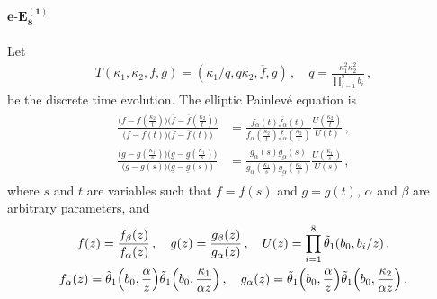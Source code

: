 \documentclass[11pt, a4paper]{article}
\theoremstyle{definition}
\begin{document}
\paragraph{$ \boldsymbol{e\text{-}E_8^{(1)}} $}
Let
\begin{align}\label{eq:discrete-time}
   T(\kappa_1,\kappa_2,f,g) = (\kappa_1/q,q \kappa_2, \overline{f}, \overline{g}) \, , \quad
   q = \frac{\kappa_1^2 \kappa_2^2}{\prod_{i=1}^8 b_i} \, ,
\end{align}
be the discrete time evolution. The elliptic Painlev\'e equation is
\begin{align}
    \begin{aligned}\label{eq:eE8}
        \frac{\bigl(f-f(\frac{\kappa_2}{t}) \bigr) \bigl(\overline{f}-\overline{f}(\frac{\kappa_2}{t}) \bigr)}{\bigl(f-f(t) \bigr) \bigl(\overline{f}-\overline{f}(t) \bigr)} &= \frac{f_\alpha(t) \overline{f_\alpha}(t)}{f_\alpha(\frac{\kappa_2}{t}) \overline{f_\alpha}(\frac{\kappa_2}{t})} \frac{U(\frac{\kappa_2}{t})}{U(t)} \, , \\
        \frac{\bigl(g-g(\frac{\kappa_1}{s})\bigr) \bigl(\underline{g}-\underline{g}(\frac{\kappa_1}{s})\bigr)}{\bigl(g-g(s)\bigr)\bigl(\underline{g}-\underline{g}(s)\bigr)} &= \frac{g_\alpha(s) \underline{g_\alpha}(s)}{g_\alpha(\frac{\kappa_1}{s}) \underline{g_\alpha}(\frac{\kappa_1}{s})} \frac{U(\frac{\kappa_1}{s})}{U(s)} \, ,
    \end{aligned}
\end{align}
where $ s $ and $ t $ are variables such that $ f=f(s) $ and $ g=g(t) $, $ \alpha $ and $ \beta $ are arbitrary parameters, and
\begin{gather}
    \begin{gathered}
        f(z) = \frac{f_\beta(z)}{f_\alpha(z)} \, , \quad
        g(z) = \frac{g_\beta(z)}{g_\alpha(z)} \, , \quad
        U(z) = \prod_{i=1}^8 \tilde{\theta}_1(b_0, b_i/z) \, , \\
        f_\alpha(z) = \tilde{\theta}_1\Bigl(b_0, \frac{\alpha}{z}\Bigr) \tilde{\theta}_1\Bigl(b_0, \frac{\kappa_1}{\alpha z}\Bigr) \, , \quad
        g_\alpha(z) = \tilde{\theta}_1\Bigl(b_0, \frac{\alpha}{z}\Bigr) \tilde{\theta}_1\Bigl(b_0, \frac{\kappa_2}{\alpha z}\Bigr) \, .
    \end{gathered}
\end{gather}
\end{document}
